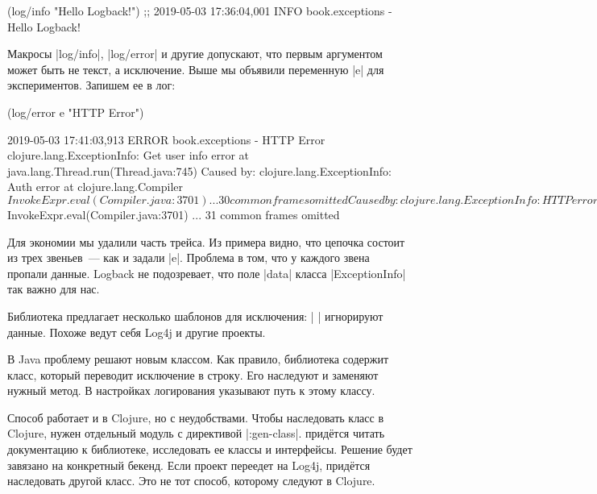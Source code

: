 \begin{english}
  \begin{clojure}
(log/info "Hello Logback!")
;; 2019-05-03 17:36:04,001 INFO book.exceptions - Hello Logback!
  \end{clojure}
\end{english}

\label{log-ex-param}

Макросы \spverb|log/info|, \spverb|log/error| и другие допускают, что первым
аргументом может быть не текст, а исключение. Выше мы объявили переменную
\spverb|e| для экспериментов. Запишем ее в лог:

\begin{english}
  \begin{clojure}
(log/error e "HTTP Error")

2019-05-03 17:41:03,913 ERROR book.exceptions - HTTP Error
clojure.lang.ExceptionInfo: Get user info error
    at java.lang.Thread.run(Thread.java:745)
Caused by: clojure.lang.ExceptionInfo: Auth error
    at clojure.lang.Compiler$InvokeExpr.eval(Compiler.java:3701)
    ... 30 common frames omitted
Caused by: clojure.lang.ExceptionInfo: HTTP error
    at clojure.lang.Compiler$InvokeExpr.eval(Compiler.java:3701)
    ... 31 common frames omitted
  \end{clojure}
\end{english}

Для экономии мы удалили часть трейса. Из примера видно, что цепочка состоит из
трех звеньев~--- как и задали \spverb|e|. Проблема в том, что у каждого звена
пропали данные. Logback не подозревает, что поле \spverb|data| класса
\spverb|ExceptionInfo| так важно для нас.

Библиотека предлагает несколько шаблонов для исключения: \spverb|%
\spverb|%
игнорируют данные. Похоже ведут себя Log4j и другие проекты.

В Java проблему решают новым классом. Как правило, библиотека содержит класс,
который переводит исключение в строку. Его наследуют и заменяют нужный метод. В
настройках логирования указывают путь к этому классу.

Способ работает и в Clojure, но с неудобствами. Чтобы наследовать класс в
Clojure, нужен отдельный модуль с директивой \spverb|:gen-class|. прид\"{е}тся
читать документацию к библиотеке, исследовать ее классы и интерфейсы. Решение
будет завязано на конкретный бекенд. Если проект переедет на Log4j, прид\"{е}тся
наследовать другой класс. Это не тот способ, которому следуют в Clojure.

